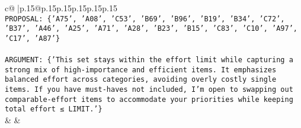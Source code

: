 \documentclass{article}
\begin{document}
{\begin{supertabular}{c@{$\;$}|p{.15\linewidth}@{}p{.15\linewidth}p{.15\linewidth}p{.15\linewidth}p{.15\linewidth}p{.15\linewidth}}
{{{\\ 
\texttt{PROPOSAL: \{'A75', 'A08', 'C53', 'B69', 'B96', 'B19', 'B34', 'C72', 'B37', 'A46', 'A25', 'A71', 'A28', 'B23', 'B15', 'C83', 'C10', 'A97', 'C17', 'A87'\}} \\
\\ 
\texttt{ARGUMENT: \{'This set stays within the effort limit while capturing a strong mix of high{-}importance and efficient items. It emphasizes balanced effort across categories, avoiding overly costly single items. If you have must{-}haves not included, I’m open to swapping out comparable{-}effort items to accommodate your priorities while keeping total effort ≤ LIMIT.'\}} \\
            }
        }
    }
    & & \\ \\


\end{supertabular}}
\end{document}
